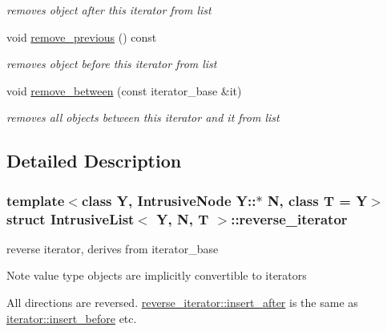 \begin{DoxyCompactItemize}
\begin{DoxyCompactList}\small\item\em removes object after this iterator from list \end{DoxyCompactList}\item 
\hypertarget{structIntrusiveList_1_1reverse__iterator_aa918d947450c5bcc65dbe4de1eecd783}{}void \hyperlink{structIntrusiveList_1_1reverse__iterator_aa918d947450c5bcc65dbe4de1eecd783}{remove\+\_\+previous} () const \label{structIntrusiveList_1_1reverse__iterator_aa918d947450c5bcc65dbe4de1eecd783}

\begin{DoxyCompactList}\small\item\em removes object before this iterator from list \end{DoxyCompactList}\item 
\hypertarget{structIntrusiveList_1_1reverse__iterator_a3f9121eb62860560cd04d2cd207ae644}{}void \hyperlink{structIntrusiveList_1_1reverse__iterator_a3f9121eb62860560cd04d2cd207ae644}{remove\+\_\+between} (const iterator\+\_\+base \&it)\label{structIntrusiveList_1_1reverse__iterator_a3f9121eb62860560cd04d2cd207ae644}

\begin{DoxyCompactList}\small\item\em removes all objects between this iterator and it from list \end{DoxyCompactList}\end{DoxyCompactItemize}


\subsection{Detailed Description}
\subsubsection*{template$<$class Y, Intrusive\+Node Y\+::$\ast$ N, class T = Y$>$struct Intrusive\+List$<$ Y, N, T $>$\+::reverse\+\_\+iterator}

reverse iterator, derives from iterator\+\_\+base 

\begin{DoxyNote}{Note}
value type objects are implicitly convertible to iterators 

All directions are reversed. \hyperlink{structIntrusiveList_1_1reverse__iterator_abfda2bc32c61407c4042cb1fca3f51b4}{reverse\+\_\+iterator\+::insert\+\_\+after} is the same as \hyperlink{structIntrusiveList_1_1iterator_ae56c28dede92a6c4e548a333d86667e5}{iterator\+::insert\+\_\+before} etc. 
\end{DoxyNote}



